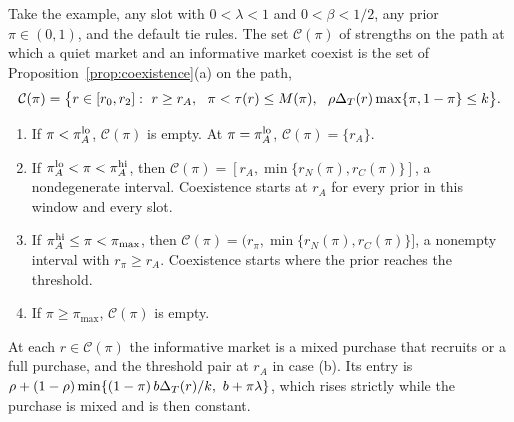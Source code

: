 \renewcommand{\thecorollary}{A.\arabic{corollary}}
\renewcommand{\theHcorollary}{A.\arabic{corollary}}
\setcounter{corollary}{1}
\begin{corollary}\label{prop:priors}
Take the example, any slot with \(0<\lambda<1\) and \(0<\beta<1/2\), any prior \(\pi\in(0,1)\), and the default tie
rules. The set \(\mathcal C(\pi)\) of strengths on the path at which a quiet market and an informative market coexist
is the set of Proposition~\ref{prop:coexistence}(a) on the path,
\[
\mathcal C(\pi)=\bigl\{r\in[r_0,r_2]:\ r\ge r_A,\ \ \pi<\tau(r)\le M(\pi),\ \ \rho\Delta_T(r)\max\{\pi,1-\pi\}\le k\bigr\}.
\]
\begin{enumerate}[label=(\alph*),leftmargin=2em]
\item If \(\pi<\pi_A^{\rm lo}\), \(\mathcal C(\pi)\) is empty. At \(\pi=\pi_A^{\rm lo}\), \(\mathcal C(\pi)=\{r_A\}\).
\item If \(\pi_A^{\rm lo}<\pi<\pi_A^{\rm hi}\), then \(\mathcal C(\pi)=[r_A,\min\{r_N(\pi),r_C(\pi)\}]\), a nondegenerate
interval. Coexistence starts at \(r_A\) for every prior in this window and every slot.
\item If \(\pi_A^{\rm hi}\le\pi<\pi_{\max}\), then \(\mathcal C(\pi)=(r_\pi,\min\{r_N(\pi),r_C(\pi)\}]\), a nonempty
interval with \(r_\pi\ge r_A\). Coexistence starts where the prior reaches the threshold.
\item If \(\pi\ge\pi_{\max}\), \(\mathcal C(\pi)\) is empty.
\end{enumerate}
At each \(r\in\mathcal C(\pi)\) the informative market is a mixed purchase that recruits or a full purchase, and the
threshold pair at \(r_A\) in case (b). Its entry is \(\rho+(1-\rho)\min\{(1-\pi)\,b\DT(r)/k,\ b+\pi\lambda\}\), which
rises strictly while the purchase is mixed and is then constant.
\end{corollary}

